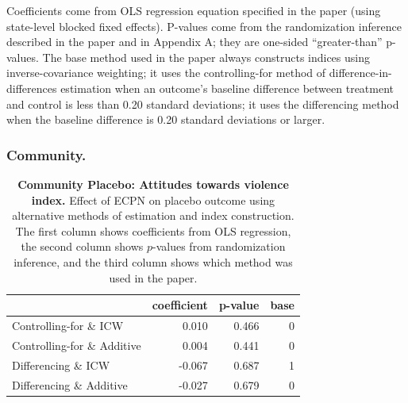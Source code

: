 \documentclass[
]{article}
\begin{document}
Coefficients come from OLS regression equation specified in the paper
(using state-level blocked fixed effects). P-values come from the
randomization inference described in the paper and in Appendix A; they
are one-sided ``greater-than'' p-values. The base method used in the
paper always constructs indices using inverse-covariance weighting; it
uses the controlling-for method of difference-in-differences estimation
when an outcome's baseline difference between treatment and control is
less than 0.20 standard deviations; it uses the differencing method when
the baseline difference is 0.20 standard deviations or larger.

\hypertarget{community.}{%
\subsubsection{Community.}\label{community.}}

\begin{table}[H]
\begin{center}
\label{tab:pl_vio_tab}
\caption{\textbf{Community Placebo: Attitudes towards violence index.} Effect of ECPN on placebo outcome using alternative methods of estimation and index construction. The first column shows coefficients from OLS regression, the second column shows $p$-values from randomization inference, and the third column shows which method was used in the paper.}
\smallskip

\begin{tabular}{l|r|r|r}
\hline
  & coefficient & p-value & base\\
\hline
Controlling-for \& ICW & 0.010 & 0.466 & 0\\
\hline
Controlling-for \& Additive & 0.004 & 0.441 & 0\\
\hline
Differencing \& ICW & -0.067 & 0.687 & 1\\
\hline
Differencing \& Additive & -0.027 & 0.679 & 0\\
\hline
\end{tabular}


\end{center}
\end{table}
\end{document}
